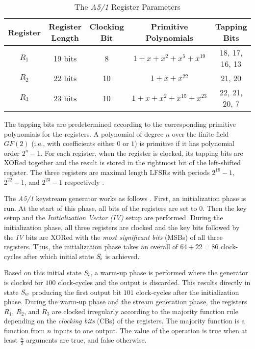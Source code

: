 \documentclass{llncs}
\begin{document}
\begin{table}[ht]
\caption{The \emph{A5/1} Register Parameters} \centering      \begin{tabular}{c c c c c}  \hline\hline                        Register & Register Length & Clocking Bit & Primitive Polynomials & Tapping Bits \\ [0.5ex] \hline                    $R_{1}$ & 19 bits & 8 & $1 + x + x^2 + x^5 + x^{19}$ & 18, 17, 16, 13 \\ 
$R_{2}$ & 22 bits & 10 & $1 + x + x^{22}$ & 21, 20 \\ 
$R_{3}$ & 23 bits & 10 & $1 + x + x^2 + x^{15} + x^{23}$ & 22, 21, 20, 7  \\ [1ex]       \hline     \end{tabular} 
\label{par}  \end{table}

The tapping bits are predetermined according to the corresponding primitive polynomials for the registers. A polynomial of degree $n$ over the finite field $GF(2)$ (i.e., with coefficients either $0$ or $1$) is primitive if it has polynomial order $2^{n} -1$.
For each register, when the register is clocked, its tapping bits are XORed together and the result is stored in the rightmost bit of the left-shifted register. The three registers are maximal length LFSRs with periods $2^{19} - 1$, $2^{22} - 1$, and $2^{23} - 1$ respectively \cite{[period]}.

The \emph {A5/1} keystream generator works as follows \cite{[Bri]}. First, an initialization phase is run. At the start of this phase, all bits of the registers are set to $0$. Then the key setup and the \emph{Initialization Vector (IV)} setup are performed. During the initialization phase, all three registers are clocked and the key bits followed by the \emph{IV} bits are XORed with the \emph{most significant bits} (MSBs) of all three registers. Thus, the initialization phase takes an overall of $64 + 22 = 86$ clock-cycles after which initial state $\emph S_{i}$ is achieved.

Based on this initial state $\emph S_{i}$, a warm-up phase is performed where the generator is clocked for $100$ clock-cycles and the output is discarded. This results directly in state $\emph S_{w}$ producing the first output bit $101$ clock-cycles after the initialization phase. During the warm-up phase and the stream generation phase, the registers $R_{1}$, $R_{2}$, and $R_{3}$ are clocked irregularly according to the majority function rule \cite{[Donald]} depending on the \emph{clocking bits} (CBs) of the registers. The majority function is a function from $n$ inputs to one output. The value of the operation is true when at least $\frac{n}{2}$ arguments are true, and false otherwise.
\end{document}
